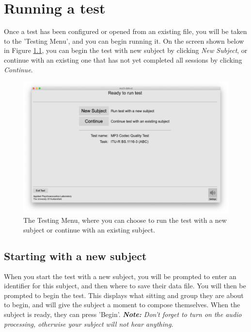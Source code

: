 \chapter{Running a test}\label{chap::run}
Once a test has been configured or opened from an existing file, you will be taken to the 'Testing Menu', and you can begin running it. On the screen shown below in Figure \ref{run::testingMenu}, you can begin the test with new subject by clicking \emph{New Subject}, or continue with an existing one that has not yet completed all sessions by clicking \emph{Continue}. 

\begin{figure}[ht]
	\centering
	\includegraphics[width=1.0\textwidth]{./images/run_subjectMenu.png}
	\caption{The Testing Menu, where you can choose to run the test with a new subject or continue with an existing subject.}
	\label{run::testingMenu}
\end{figure}
\pagebreak

\section{Starting with a new subject}
When you start the test with a new subject, you will be prompted to enter an identifier for this subject, and then where to save their data file. You will then be prompted to begin the test. This displays what sitting and group they are about to begin, and will give the subject a moment to compose themselves. When the subject is ready, they can press 'Begin'.
\newline\newline
\noindent
\textit{\textbf{Note:} Don't forget to turn on the audio processing, otherwise your subject will not hear anything.}

